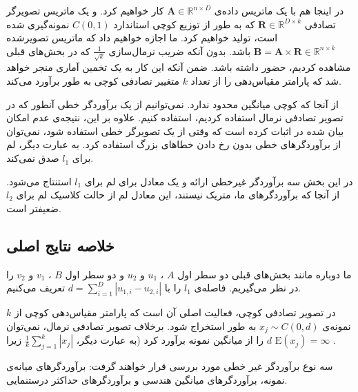 در اینجا هم با یک ماتریس داده‌ی 
$\mathbf{A} \in \mathbb{R}^{n \times D}$
کار خواهیم کرد. و یک ماتریس تصویرگر تصادفی 
$\mathbf{R} \in \mathbb{R}^{D \times k}$
که به طور 
از توزیع کوچی استاندارد 
$C(0,1)$
نمونه‌گیری شده است، تولید خواهیم کرد.
ما اجازه خواهیم داد که ماتریس تصویرشده 
$\mathbf{B} = \mathbf{A} \times \mathbf{R} \in \mathbb{R}^{n \times k}$
باشد. بدون آنکه ضریب نرمال‌سازی 
$\frac{1}{\sqrt{k}}$
که در بخش‌های قبلی مشاهده کردیم، حضور داشته باشد. ضمن آنکه این کار به یک تخمین آماری منجر خواهد شد که پارامتر مقیاس‌دهی را از تعداد 
$k$
متغییر تصادفی کوچی به طور 
برآورد می‌کند.

از آنجا که کوچی میانگین محدود ندارد. نمی‌توانیم از یک برآوردگر خطی آنطور که در تصویر تصادفی نرمال استفاده کردیم، استفاده کنیم. علاوه بر این، نتیجه‌ی عدم امکان بیان شده در 
\cite{litez32, litez109, litez33}
اثبات کرده است که وقتی از یک تصویرگر خطی استفاده شود، نمی‌توان از برآوردگرهای خطی بدون رخ دادن خطاهای بزرگ استفاده کرد. به عبارت دیگر، لم
برای 
$l_1$
صدق نمی‌کند.

در این بخش سه برآوردگر غیرخطی ارائه و یک معادل برای لم 
برای 
$l_1$
استنتاج  می‌شود. از آنجا که برآوردگرهای ما، متریک نیستند، این معادل لم 
از حالت کلاسیک لم
برای 
$l_2$
ضعیفتر است.

\subsection{
خلاصه نتایج اصلی
}

ما دوباره مانند بخش‌های قبلی دو سطر اول 
$A$
،
$u_1$
و 
$u_2$
و دو سطر اول 
$B$
،
$v_1$
و 
$v_2$
را در نظر می‌گیریم. فاصله‌ی 
$l_1$
را با 
$d = \sum_{i=1}^D | u_{1,i} - u_{2,i} | $
تعریف می‌کنیم. 

در تصویر تصادفی کوچی، فعالیت اصلی آن است که پارامتر مقیاس‌دهی کوچی از 
$k$
نمونه‌ی 
$x_j \sim C(0,d)$
به طور 
استخراج شود. برخلاف تصویر تصادفی نرمال، نمی‌توان 
$d$ 
را از میانگین نمونه برآورد کرد (به عبارت دیگر، 
$\frac{1}{k} \sum_{j=1}^k \left| x_j \right|$
زیرا 
$\mathrm{E}(x_j) = \infty$
. 

سه نوع برآوردگر غیر خطی مورد بررسی قرار خواهند گرفت: برآوردگرهای میانه‌ی نمونه، برآوردگرهای میانگین هندسی و برآوردگرهای حداکثر درستنمایی.

